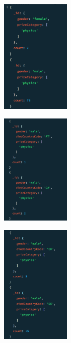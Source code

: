 \documentclass{article}
\begin{document}
\begin{multicols*}{3}
    \begin{figure}[H]
        \includegraphics[width=0.3\textwidth]{images/q4a.png}
    \end{figure}

    \columnbreak

    \begin{figure}[H]
        \includegraphics[width=0.3\textwidth]{images/q4b.png}
    \end{figure}

    \columnbreak

    \begin{figure}[H]
        \includegraphics[width=0.3\textwidth]{images/q4c.png}
    \end{figure}
\end{multicols*}
\end{document}

